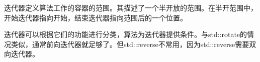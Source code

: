 迭代器定义算法工作的容器的范围。其描述了一个半开放的范围。在半开范围中，开始迭代器指向开始，结束迭代器指向范围后的一个位置。

迭代器可以根据它们的功能进行分类，算法为迭代器提供条件。与std::rotate的情况类似，通常前向迭代器就足够了。但std::reverse不常用，因为std::reverse需要双向迭代器。

















